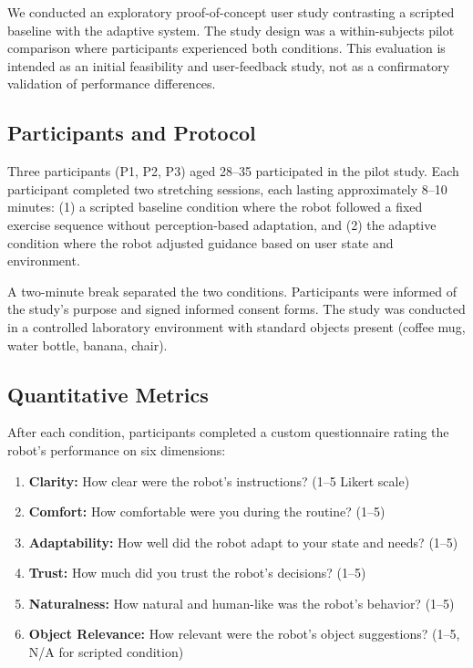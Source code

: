 \documentclass[pdflatex,sn-basic,Numbered,iicol,twocolumn]{sn-jnl}%
\begin{document}
We conducted an exploratory proof-of-concept user study contrasting a scripted baseline with the adaptive system. The study design was a within-subjects pilot comparison where participants experienced both conditions. This evaluation is intended as an initial feasibility and user-feedback study, not as a confirmatory validation of performance differences.

\subsection{Participants and Protocol}

Three participants (P1, P2, P3) aged 28–35 participated in the pilot study. Each participant completed two stretching sessions, each lasting approximately 8–10 minutes: (1) a scripted baseline condition where the robot followed a fixed exercise sequence without perception-based adaptation, and (2) the adaptive condition where the robot adjusted guidance based on user state and environment.

A two-minute break separated the two conditions. Participants were informed of the study's purpose and signed informed consent forms. The study was conducted in a controlled laboratory environment with standard objects present (coffee mug, water bottle, banana, chair).

\subsection{Quantitative Metrics}

After each condition, participants completed a custom questionnaire rating the robot's performance on six dimensions:

\begin{enumerate}
\item \textbf{Clarity:} How clear were the robot's instructions? (1–5 Likert scale)
\item \textbf{Comfort:} How comfortable were you during the routine? (1–5)
\item \textbf{Adaptability:} How well did the robot adapt to your state and needs? (1–5)
\item \textbf{Trust:} How much did you trust the robot's decisions? (1–5)
\item \textbf{Naturalness:} How natural and human-like was the robot's behavior? (1–5)
\item \textbf{Object Relevance:} How relevant were the robot's object suggestions? (1–5, N/A for scripted condition)
\end{enumerate}
\end{document}

